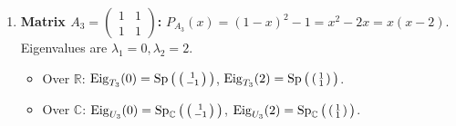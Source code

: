 \begin{exercisesolution*}
\begin{enumerate}[label=\textbf{(\alph*)}]
    \item \textbf{Matrix $A_3 = \left(\begin{smallmatrix} 1 & 1 \\ 1 & 1 \end{smallmatrix}\right)$:}
    $P_{A_3}(x) = (1-x)^2 - 1 = x^2 - 2x = x(x-2)$.
    Eigenvalues are $\lambda_1 = 0, \lambda_2 = 2$.
    \begin{itemize}
        \item Over $\mathbb{R}$: $\operatorname{Eig}_{T_3}(0) = \operatorname{Sp}\big(\left(\begin{smallmatrix} 1 \\ -1 \end{smallmatrix}\right)\big)$, $\operatorname{Eig}_{T_3}(2) = \operatorname{Sp}\big(\left(\begin{smallmatrix} 1 \\ 1 \end{smallmatrix}\right)\big)$.
        \item Over $\mathbb{C}$: $\operatorname{Eig}_{U_3}(0) = \operatorname{Sp}_\mathbb{C}\big(\left(\begin{smallmatrix} 1 \\ -1 \end{smallmatrix}\right)\big)$, $\operatorname{Eig}_{U_3}(2) = \operatorname{Sp}_\mathbb{C}\big(\left(\begin{smallmatrix} 1 \\ 1 \end{smallmatrix}\right)\big)$. \qedhere
    \end{itemize}
\end{enumerate}
\end{exercisesolution*}


